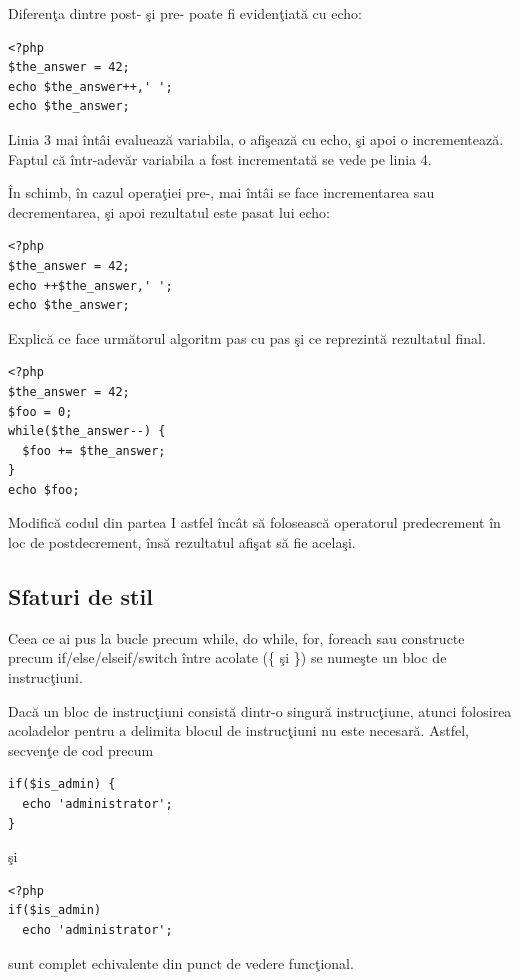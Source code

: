 Diferenţa dintre post- şi pre- poate fi evidenţiată cu echo:
\begin{lstlisting}
<?php
$the_answer = 42;
echo $the_answer++,' ';
echo $the_answer;
\end{lstlisting}
Linia 3 mai întâi evaluează variabila, o afişează cu echo, şi apoi
o incrementează. Faptul că într-adevăr variabila a fost incrementată
se vede pe linia 4.

În schimb, în cazul operaţiei {\glqq}pre-{\grqq}, mai întâi se face incrementarea sau decrementarea,
şi apoi rezultatul este pasat lui echo:
\begin{lstlisting}
<?php
$the_answer = 42;
echo ++$the_answer,' ';
echo $the_answer;
\end{lstlisting}

\begin{Exercise}[title={Decrementarea într-o buclă},difficulty=1]
\ExePart
Explică ce face următorul algoritm pas cu pas şi ce reprezintă rezultatul final.
\begin{lstlisting}
<?php
$the_answer = 42;
$foo = 0;
while($the_answer--) {
  $foo += $the_answer;
}
echo $foo;
\end{lstlisting}
\ExePart
Modifică codul din partea I astfel încât să folosească operatorul predecrement în loc de postdecrement,
însă rezultatul afişat să fie acelaşi.
\end{Exercise}

\subsection{Sfaturi de stil}
Ceea ce ai pus la bucle precum while, do while, for, foreach sau constructe
precum if/else/elseif/switch între acolate (\{ şi \}) se numeşte un bloc de instrucţiuni.

Dacă un bloc de instrucţiuni consistă dintr-o singură instrucţiune, atunci folosirea
acoladelor pentru a delimita blocul de instrucţiuni nu este necesară. Astfel, secvenţe
de cod precum
\begin{lstlisting}
if($is_admin) {
  echo 'administrator';
}
\end{lstlisting}
şi
\begin{lstlisting}
<?php
if($is_admin)
  echo 'administrator';
\end{lstlisting}
sunt complet echivalente din punct de vedere funcţional.


